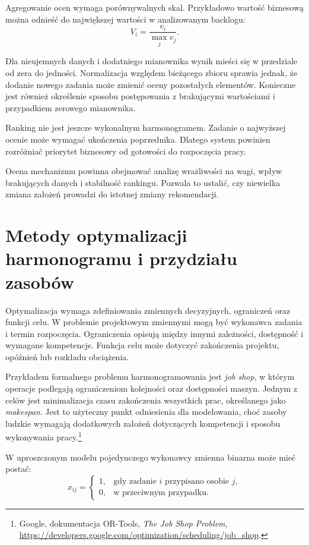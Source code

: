 Agregowanie ocen wymaga porównywalnych skal. Przykładowo wartość biznesową można odnieść do największej wartości w analizowanym backlogu:
\begin{equation}
    V_i = \frac{v_i}{\max_j v_j}.
    \label{eq:normalizacja-wartosci}
\end{equation}

Dla nieujemnych danych i dodatniego mianownika wynik mieści się w przedziale od zera do jedności. Normalizacja względem bieżącego zbioru sprawia jednak, że dodanie nowego zadania może zmienić oceny pozostałych elementów. Konieczne jest również określenie sposobu postępowania z brakującymi wartościami i przypadkiem zerowego mianownika.

Ranking nie jest jeszcze wykonalnym harmonogramem. Zadanie o najwyższej ocenie może wymagać ukończenia poprzednika. Dlatego system powinien rozróżniać priorytet biznesowy od gotowości do rozpoczęcia pracy.

Ocena mechanizmu powinna obejmować analizę wrażliwości na wagi, wpływ brakujących danych i stabilność rankingu. Pozwala to ustalić, czy niewielka zmiana założeń prowadzi do istotnej zmiany rekomendacji.


\section{Metody optymalizacji harmonogramu i przydziału zasobów}
\label{sec:optymalizacja-harmonogramu}

Optymalizacja wymaga zdefiniowania zmiennych decyzyjnych, ograniczeń oraz funkcji celu. W problemie projektowym zmiennymi mogą być wykonawca zadania i termin rozpoczęcia. Ograniczenia opisują między innymi zależności, dostępność i wymagane kompetencje. Funkcja celu może dotyczyć zakończenia projektu, opóźnień lub rozkładu obciążenia.

Przykładem formalnego problemu harmonogramowania jest \textit{job shop}, w którym operacje podlegają ograniczeniom kolejności oraz dostępności maszyn. Jednym z celów jest minimalizacja czasu zakończenia wszystkich prac, określanego jako \textit{makespan}. Jest to użyteczny punkt odniesienia dla modelowania, choć zasoby ludzkie wymagają dodatkowych założeń dotyczących kompetencji i sposobu wykonywania pracy.\footnote{Google, dokumentacja OR-Tools, \textit{The Job Shop Problem}, \url{https://developers.google.com/optimization/scheduling/job_shop}.}

W uproszczonym modelu pojedynczego wykonawcy zmienna binarna może mieć postać:
\begin{equation}
    x_{ij} =
    \begin{cases}
        1, & \text{gdy zadanie \(i\) przypisano osobie \(j\)},\\
        0, & \text{w przeciwnym przypadku}.
    \end{cases}
    \label{eq:zmienna-przydzialu}
\end{equation}


